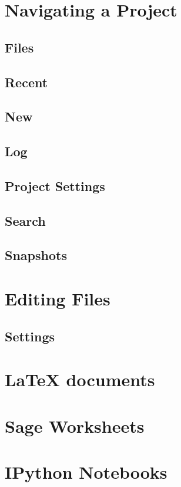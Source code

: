 \documentclass{article}
\begin{document}
\section{Navigating a Project}\label{sec:project}

\subsection{Files}
\subsection{Recent}

\subsection{New}
\subsection{Log}
\subsection{Project Settings}
\subsection{Search}

\subsection{Snapshots}

\section{Editing Files}\label{sec:files}

\subsection{Settings}

\section{\LaTeX{} documents}\label{sec:latex}

\section{Sage Worksheets}\label{sec:sagews}

\section{IPython Notebooks}\label{sec:ipython}
\end{document}
